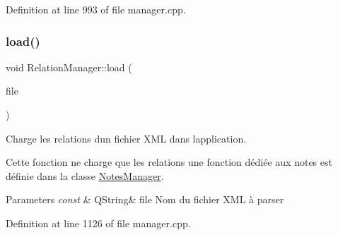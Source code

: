 Definition at line 993 of file manager.\+cpp.

\mbox{\label{class_relation_manager_a37273bc4c1d223bf99ff10ba7feba50a}} 
\subsubsection{\texorpdfstring{load()}{load()}}
{\footnotesize\ttfamily void Relation\+Manager\+::load (\begin{DoxyParamCaption}\item[{const Q\+String \&}]{file }\end{DoxyParamCaption})}



Charge les relations d\textquotesingle{}un fichier X\+ML dans l\textquotesingle{}application. 

Cette fonction ne charge que les relations une fonction dédiée aux notes est définie dans la classe \hyperlink{class_notes_manager}{Notes\+Manager}. 
\begin{DoxyParams}{Parameters}
{\em const} & Q\+String\& file Nom du fichier X\+ML à parser \\
\hline
\end{DoxyParams}


Definition at line 1126 of file manager.\+cpp.

